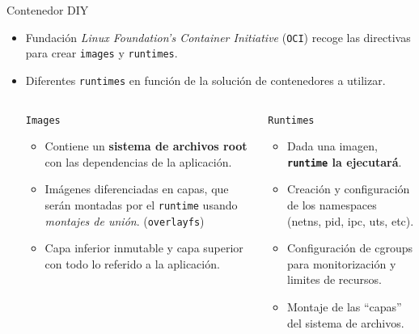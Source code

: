 \documentclass[aspectratio=169,xcolor=dvipsnames]{beamer}
\begin{document}
	\begin{frame}{Contenedor DIY}
	    \begin{itemize}
	        \item Fundación \textit{Linux Foundation's Container Initiative} (\texttt{OCI}) recoge las directivas para crear \texttt{images} y \texttt{runtimes}.
	        \item Diferentes \texttt{runtimes} en función de la solución de contenedores a utilizar.
	        
	        \begin{columns}
	                \begin{column}{0.5\textwidth}
	                \begin{exampleblock}{\texttt{Images}}
	                    \begin{itemize}
	                        \item Contiene un \textbf{sistema de archivos root} con las dependencias de la aplicación.
	                        \item Imágenes diferenciadas en capas, que serán montadas por el \texttt{runtime} usando \textit{montajes de unión}. (\texttt{overlayfs})
	                        \item Capa inferior inmutable y capa superior con todo lo referido a la aplicación.
	                    \end{itemize}
	                \end{exampleblock}
	                \end{column}
	                
	                \begin{column}{0.5\textwidth}
	                \begin{exampleblock}{\texttt{Runtimes}}
	                    \begin{itemize}
	                        \item Dada una imagen, \textbf{\texttt{runtime} la ejecutará}.
	                        \item Creación y configuración de los namespaces (netns, pid, ipc, uts, etc).
	                        \item Configuración de cgroups para monitorización y limites de recursos.
	                        \item Montaje de las ``capas'' del sistema de archivos.
	                    \end{itemize}
	                \end{exampleblock}    
	                \end{column}
	        \end{columns}
	    \end{itemize}
	\end{frame}
	
\end{document}
